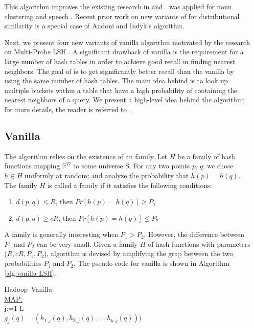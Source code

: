 This algorithm improves the existing research in \lsh and \plebf \cite{Indyk98STOC,Charikar02STOC}. 
\plebf was applied for noun clustering \cite{ravichandran05} and speech \cite {JansenASRU11,JansenIS12}. 
Recent prior work on new variants of \plebf  \cite{goyal12Flag} for distributional similarity is a special case of Andoni and Indyk's \lsh algorithm. 

Next, we present four new variants of vanilla \lsh algorithm motivated by the research on Multi-Probe LSH \cite{LvVLDB07}. 
A signiﬁcant drawback of vanilla \lsh is the requirement for a large number of hash tables in order to achieve good recall 
in finding nearest neighbors. The goal of  \mblshf is to get signiﬁcantly better recall than the vanilla \lsh by using 
the same number of hash tables. The main idea behind \mblshf is to look up multiple buckets within a table that have a high probability 
of containing the nearest neighbors of a query. We present a high-level idea behind the \mblshf algorithm; 
for more details, the reader is referred to \cite{LvVLDB07}.


\subsection{Vanilla \lsh}
\label{sec:vlsh}
The \lsh algorithm relies on the existence of an \lsh family. Let $H$ be a family of hash functions mapping 
 $\mathbb{R}^D$ to some universe S. For any two points $p$, $q$; we chose $h\in H$ uniformly at random; 
 and analyze the probability that $h(p) = h(q)$.  The family $H$ is called a \lsh family if 
 it satisfies the following conditions:

\begin{enumerate}
\item $d(p,q) \leq R$, then $Pr[h(p)=h(q)] \geq P_1$ 
\item $d(p,q) \geq cR$, then $Pr[h(p)=h(q)] \leq P_2$
\end{enumerate}

A family is generally interesting when  $P_1>P_2$. However, the difference between $P_1$ and $P_2$ can be very small. 
Given a family $H$ of hash functions with parameters ($R, cR, P_1,P_2$), 
\lsh algorithm is devised by amplifying the grap between the two probabilities $P_1$ and $P_2$. 
The pseudo code for vanilla \lsh is shown in Algorithm \ref{alg:vanilla-LSH}. 

\mbox{Hadoop Vanilla \lsh} \\
\mbox{\small {\underline {MAP:}}} \\
  \FOR j:=1 \TO L  \\
	     $g_j(q)=(h_{1,j}(q),h_{2,j}(q),\dots,h_{k,j}(q)))$ \\

